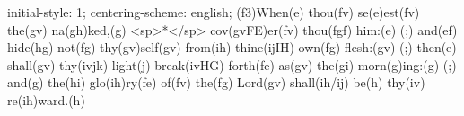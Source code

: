 initial-style: 1;
centering-scheme: english;
(f3)When(e) thou(fv) se(e)est(fv) the(gv) na(gh)ked,(g) <sp>*</sp> cov(gvFE)er(fv) thou(fgf) him:(e) (;) and(ef) hide(hg) not(fg) thy(gv)self(gv) from(ih) thine(ijIH) own(fg) flesh:(gv) (;) then(e) shall(gv) thy(ivjk) light(j) break(ivHG) forth(fe) as(gv) the(gi) morn(g)ing:(g) (;) and(g) the(hi) glo(ih)ry(fe) of(fv) the(fg) Lord(gv) shall(ih/ij) be(h) thy(iv) re(ih)ward.(h)